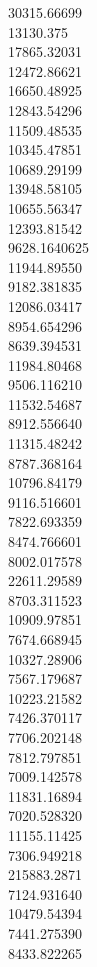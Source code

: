30315.66699\\
13130.375\\
17865.32031\\
12472.86621\\
16650.48925\\
12843.54296\\
11509.48535\\
10345.47851\\
10689.29199\\
13948.58105\\
10655.56347\\
12393.81542\\
9628.1640625\\
11944.89550\\
9182.381835\\
12086.03417\\
8954.654296\\
8639.394531\\
11984.80468\\
9506.116210\\
11532.54687\\
8912.556640\\
11315.48242\\
8787.368164\\
10796.84179\\
9116.516601\\
7822.693359\\
8474.766601\\
8002.017578\\
22611.29589\\
8703.311523\\
10909.97851\\
7674.668945\\
10327.28906\\
7567.179687\\
10223.21582\\
7426.370117\\
7706.202148\\
7812.797851\\
7009.142578\\
11831.16894\\
7020.528320\\
11155.11425\\
7306.949218\\
215883.2871\\
7124.931640\\
10479.54394\\
7441.275390\\
8433.822265\\
